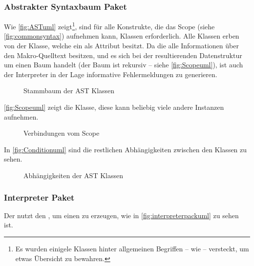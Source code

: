 {    \subsubsection{Abstrakter Syntaxbaum Paket}
    \label{sssec:Abstrakter Syntaxbaum Paket}
      Wie \autoref{fig:ASTuml} zeigt\footnote{
        Es wurden einigele Klassen hinter allgemeinen Begriffen -- wie  -- versteckt, um etwas Übersicht zu bewahren.
      }, sind für alle Konstrukte, die das Scope (siehe \autoref{fig:commonsyntax}) aufnehmen kann, Klassen erforderlich. Alle Klassen erben von der  Klasse, welche ein  als Attribut besitzt. Da die  alle Informationen über den Makro-Quelltext besitzen, und es sich bei der resultierenden Datenstruktur um einen Baum handelt (der Baum ist rekursiv -- siehe \autoref{fig:Scopeuml}), ist auch der Interpreter in der Lage informative Fehlermeldungen zu generieren.
      \begin{figure}[H]
        \centering
        \caption{Stammbaum der AST Klassen}
        \label{fig:ASTuml}
      \end{figure}

      \autoref{fig:Scopeuml} zeigt die  Klasse, diese kann beliebig viele andere  Instanzen aufnehmen.
      \begin{figure}[H]
        \centering
        \caption{Verbindungen vom Scope}
        \label{fig:Scopeuml}
      \end{figure}

      In \autoref{fig:Conditionuml} sind die restlichen Abhängigkeiten zwischen den  Klassen zu sehen.
      \begin{figure}[H]
        \centering
        \caption{Abhängigkeiten der AST Klassen}
        \label{fig:Conditionuml}
      \end{figure}

    \subsubsection{Interpreter Paket}
    \label{sssec:Interpreter Paket}
      Der  nutzt den , um einen  zu erzeugen, wie in \autoref{fig:interpreterpackuml} zu sehen ist.

}
